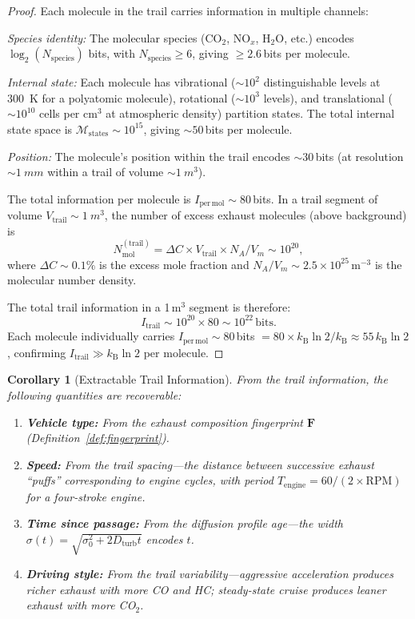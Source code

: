 \documentclass[11pt,twocolumn,a4paper]{article}
\theoremstyle{plain}
\newtheorem{corollary}[theorem]{Corollary}
\theoremstyle{definition}
\theoremstyle{remark}
\newcommand{\kB}{k_{\mathrm{B}}}
\newcommand{\Depth}{\mathcal{M}}
\newcommand{\Dturb}{D_{\mathrm{turb}}}
\newcommand{\Itrail}{I_{\mathrm{trail}}}
\begin{document}
\begin{proof}
Each molecule in the trail carries information in multiple channels:

\emph{Species identity:} The molecular species (CO$_2$, NO$_x$, H$_2$O, etc.) encodes $\log_2(N_{\mathrm{species}})$ bits, with $N_{\mathrm{species}} \geq 6$, giving $\geq 2.6$\,bits per molecule.

\emph{Internal state:} Each molecule has vibrational ($\sim 10^2$ distinguishable levels at 300~K for a polyatomic molecule), rotational ($\sim 10^3$ levels), and translational ($\sim 10^{10}$ cells per cm$^3$ at atmospheric density) partition states. The total internal state space is $\Depth_{\mathrm{states}} \sim 10^{15}$, giving $\sim 50$\,bits per molecule.

\emph{Position:} The molecule's position within the trail encodes $\sim 30$\,bits (at resolution $\sim \SI{1}{mm}$ within a trail of volume $\sim \SI{1}{m^3}$).

The total information per molecule is $I_{\mathrm{per\,mol}} \sim 80$\,bits. In a trail segment of volume $V_{\mathrm{trail}} \sim \SI{1}{m^3}$, the number of excess exhaust molecules (above background) is
\begin{equation}
N_{\mathrm{mol}}^{(\mathrm{trail})} = \Delta C \times V_{\mathrm{trail}} \times N_A / V_m \sim 10^{20},
\end{equation}
where $\Delta C \sim 0.1\%$ is the excess mole fraction and $N_A/V_m \sim 2.5 \times 10^{25}\,\mathrm{m}^{-3}$ is the molecular number density.

The total trail information in a 1\,m$^3$ segment is therefore:
\begin{equation}
\Itrail \sim 10^{20} \times 80 \sim 10^{22}\,\text{bits}.
\label{eq:trail_info_numerical}
\end{equation}
Each molecule individually carries $I_{\mathrm{per\,mol}} \sim 80$\,bits $= 80 \times \kB \ln 2 / \kB \approx 55\,\kB \ln 2$, confirming $\Itrail \gg \kB \ln 2$ per molecule.
\end{proof}

\begin{corollary}[Extractable Trail Information]
\label{cor:extractable}
From the trail information, the following quantities are recoverable:
\begin{enumerate}[nosep]
    \item \textbf{Vehicle type:} From the exhaust composition fingerprint $\mathbf{F}$ (Definition~\ref{def:fingerprint}).
    \item \textbf{Speed:} From the trail spacing---the distance between successive exhaust ``puffs'' corresponding to engine cycles, with period $T_{\mathrm{engine}} = 60/(2 \times \mathrm{RPM})$ for a four-stroke engine.
    \item \textbf{Time since passage:} From the diffusion profile age---the width $\sigma(t) = \sqrt{\sigma_0^2 + 2\Dturb t}$ encodes $t$.
    \item \textbf{Driving style:} From the trail variability---aggressive acceleration produces richer exhaust with more CO and HC; steady-state cruise produces leaner exhaust with more CO$_2$.
\end{enumerate}
\end{corollary}
\end{document}
